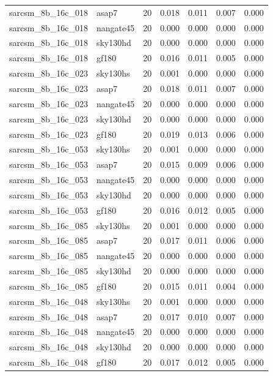 \begin{tabular}{llrrrrr}
sarcsm\_8b\_16c\_018 & asap7 & 20 & 0.018 & 0.011 & 0.007 & 0.000 \\
sarcsm\_8b\_16c\_018 & nangate45 & 20 & 0.000 & 0.000 & 0.000 & 0.000 \\
sarcsm\_8b\_16c\_018 & sky130hd & 20 & 0.000 & 0.000 & 0.000 & 0.000 \\
sarcsm\_8b\_16c\_018 & gf180 & 20 & 0.016 & 0.011 & 0.005 & 0.000 \\
sarcsm\_8b\_16c\_023 & sky130hs & 20 & 0.001 & 0.000 & 0.000 & 0.000 \\
sarcsm\_8b\_16c\_023 & asap7 & 20 & 0.018 & 0.011 & 0.007 & 0.000 \\
sarcsm\_8b\_16c\_023 & nangate45 & 20 & 0.000 & 0.000 & 0.000 & 0.000 \\
sarcsm\_8b\_16c\_023 & sky130hd & 20 & 0.000 & 0.000 & 0.000 & 0.000 \\
sarcsm\_8b\_16c\_023 & gf180 & 20 & 0.019 & 0.013 & 0.006 & 0.000 \\
sarcsm\_8b\_16c\_053 & sky130hs & 20 & 0.001 & 0.000 & 0.000 & 0.000 \\
sarcsm\_8b\_16c\_053 & asap7 & 20 & 0.015 & 0.009 & 0.006 & 0.000 \\
sarcsm\_8b\_16c\_053 & nangate45 & 20 & 0.000 & 0.000 & 0.000 & 0.000 \\
sarcsm\_8b\_16c\_053 & sky130hd & 20 & 0.000 & 0.000 & 0.000 & 0.000 \\
sarcsm\_8b\_16c\_053 & gf180 & 20 & 0.016 & 0.012 & 0.005 & 0.000 \\
sarcsm\_8b\_16c\_085 & sky130hs & 20 & 0.001 & 0.000 & 0.000 & 0.000 \\
sarcsm\_8b\_16c\_085 & asap7 & 20 & 0.017 & 0.011 & 0.006 & 0.000 \\
sarcsm\_8b\_16c\_085 & nangate45 & 20 & 0.000 & 0.000 & 0.000 & 0.000 \\
sarcsm\_8b\_16c\_085 & sky130hd & 20 & 0.000 & 0.000 & 0.000 & 0.000 \\
sarcsm\_8b\_16c\_085 & gf180 & 20 & 0.015 & 0.011 & 0.004 & 0.000 \\
sarcsm\_8b\_16c\_048 & sky130hs & 20 & 0.001 & 0.000 & 0.000 & 0.000 \\
sarcsm\_8b\_16c\_048 & asap7 & 20 & 0.017 & 0.010 & 0.007 & 0.000 \\
sarcsm\_8b\_16c\_048 & nangate45 & 20 & 0.000 & 0.000 & 0.000 & 0.000 \\
sarcsm\_8b\_16c\_048 & sky130hd & 20 & 0.000 & 0.000 & 0.000 & 0.000 \\
sarcsm\_8b\_16c\_048 & gf180 & 20 & 0.017 & 0.012 & 0.005 & 0.000 \\

\end{tabular}
